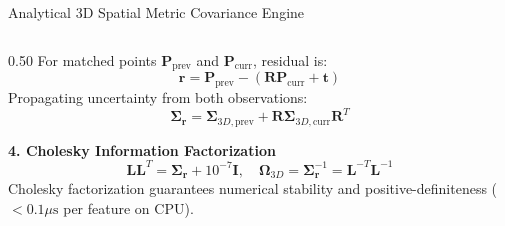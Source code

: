 \documentclass[aspectratio=169, 10pt]{beamer}
\begin{document}
\begin{frame}{Analytical 3D Spatial Metric Covariance Engine}
\begin{columns}[T]
\begin{column}{0.50\textwidth}
      For matched points $\mathbf{P}_{\text{prev}}$ and $\mathbf{P}_{\text{curr}}$, residual is:
      \begin{equation}
        \mathbf{r} = \mathbf{P}_{\text{prev}} - (\mathbf{R} \mathbf{P}_{\text{curr}} + \mathbf{t})
      \end{equation}
      Propagating uncertainty from both observations:
      \begin{equation}
        \mathbf{\Sigma}_{\mathbf{r}} = \mathbf{\Sigma}_{3D, \text{prev}} + \mathbf{R} \mathbf{\Sigma}_{3D, \text{curr}} \mathbf{R}^T
      \end{equation}

      \vspace{0.15cm}
      {\small \textbf{\textcolor{NavyBlue}{4. Cholesky Information Factorization}}}
      \begin{equation}
        \mathbf{L} \mathbf{L}^T = \mathbf{\Sigma}_{\mathbf{r}} + 10^{-7} \mathbf{I}, \quad \mathbf{\Omega}_{3D} = \mathbf{\Sigma}_{\mathbf{r}}^{-1} = \mathbf{L}^{-T} \mathbf{L}^{-1}
      \end{equation}
      \scriptsize
      Cholesky factorization guarantees numerical stability and positive-definiteness ($< 0.1\mu\text{s}$ per feature on CPU).
    \end{column}
  \end{columns}
\end{frame}
\end{document}
